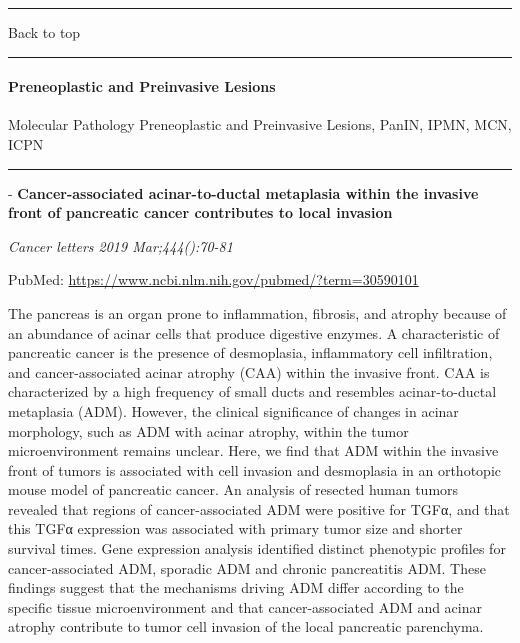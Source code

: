 \documentclass[]{article}
\let\oldparagraph\paragraph
\renewcommand{\paragraph}[1]{\oldparagraph{#1}\mbox{}}
\begin{document}
{}

{}

\begin{center}\rule{0.5\linewidth}{\linethickness}\end{center}

Back to top

\begin{center}\rule{0.5\linewidth}{\linethickness}\end{center}

\pagebreak

\hypertarget{preneoplastic-and-preinvasive-lesions-1}{%
\paragraph{Preneoplastic and Preinvasive
Lesions}\label{preneoplastic-and-preinvasive-lesions-1}}

Molecular Pathology Preneoplastic and Preinvasive Lesions, PanIN, IPMN,
MCN, ICPN

\begin{center}\rule{0.5\linewidth}{\linethickness}\end{center}

 - \textbf{Cancer-associated acinar-to-ductal metaplasia within the
invasive front of pancreatic cancer contributes to local invasion}

\emph{Cancer letters 2019 Mar;444():70-81}

PubMed: \url{https://www.ncbi.nlm.nih.gov/pubmed/?term=30590101}

The pancreas is an organ prone to inflammation, fibrosis, and atrophy
because of an abundance of acinar cells that produce digestive enzymes.
A characteristic of pancreatic cancer is the presence of desmoplasia,
inflammatory cell infiltration, and cancer-associated acinar atrophy
(CAA) within the invasive front. CAA is characterized by a high
frequency of small ducts and resembles acinar-to-ductal metaplasia
(ADM). However, the clinical significance of changes in acinar
morphology, such as ADM with acinar atrophy, within the tumor
microenvironment remains unclear. Here, we find that ADM within the
invasive front of tumors is associated with cell invasion and
desmoplasia in an orthotopic mouse model of pancreatic cancer. An
analysis of resected human tumors revealed that regions of
cancer-associated ADM were positive for TGFα, and that this TGFα
expression was associated with primary tumor size and shorter survival
times. Gene expression analysis identified distinct phenotypic profiles
for cancer-associated ADM, sporadic ADM and chronic pancreatitis ADM.
These findings suggest that the mechanisms driving ADM differ according
to the specific tissue microenvironment and that cancer-associated ADM
and acinar atrophy contribute to tumor cell invasion of the local
pancreatic parenchyma.
\end{document}
